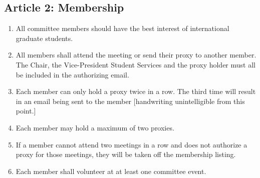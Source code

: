 \subsection{Article 2: Membership}
\begin{enumerate}
\item All committee members should have the best interest of international graduate students.  %
\item All members shall attend the meeting or send their proxy to another member. The Chair, the Vice-President Student Services and the proxy holder must all be included in the authorizing email.
\item Each member can only hold a proxy twice in a row. The third time will result in an email being sent to the member [handwriting unintelligible from this point.]
\item Each member may hold a maximum of two proxies. 
\item If a member cannot attend two meetings in a row and does not authorize a proxy for those meetings, they will be taken off the membership listing. 
\item Each member shall volunteer at at least one committee event.
\end{enumerate}
